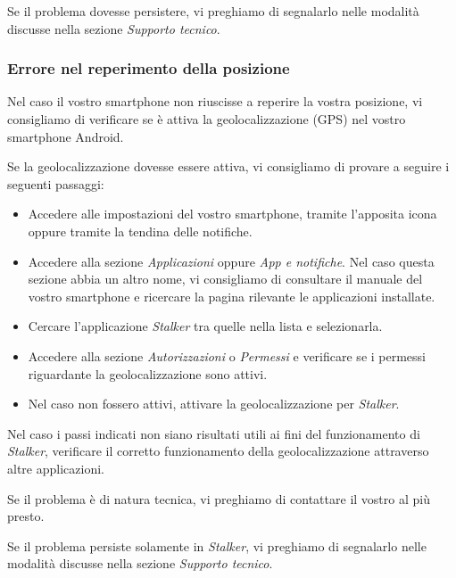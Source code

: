 \documentclass[../manuale-utente.tex]{subfiles}
\begin{document}
Se il problema dovesse persistere, vi preghiamo di segnalarlo nelle modalità discusse nella sezione \textit{Supporto tecnico}.

\subsubsection{Errore nel reperimento della posizione}%
\label{subs:mobile_app_errore_posizione}

Nel caso il vostro smartphone non riuscisse a reperire la vostra posizione, vi consigliamo di verificare se è attiva la geolocalizzazione (GPS) nel vostro smartphone Android.

Se la geolocalizzazione dovesse essere attiva, vi consigliamo di provare a seguire i seguenti passaggi:
\begin{itemize}
    \item Accedere alle impostazioni del vostro smartphone, tramite l'apposita icona oppure tramite la tendina delle notifiche.
    \item Accedere alla sezione \textit{Applicazioni} oppure \textit{App e notifiche}. Nel caso questa sezione abbia un altro nome, vi consigliamo di consultare il manuale del vostro smartphone e ricercare la pagina rilevante le applicazioni installate.
    \item Cercare l'applicazione \textit{Stalker} tra quelle nella lista e selezionarla.
    \item Accedere alla sezione \textit{Autorizzazioni} o \textit{Permessi} e verificare se i permessi riguardante la geolocalizzazione sono attivi.
    \item Nel caso non fossero attivi, attivare la geolocalizzazione per \textit{Stalker}.
\end{itemize}

Nel caso i passi indicati non siano risultati utili ai fini del funzionamento di \textit{Stalker}, verificare il corretto funzionamento della geolocalizzazione attraverso altre applicazioni.

Se il problema è di natura tecnica, vi preghiamo di contattare il vostro \textit{} al più presto.

Se il problema persiste solamente in \textit{Stalker}, vi preghiamo di segnalarlo nelle modalità discusse nella sezione \textit{Supporto tecnico}.
\end{document}
